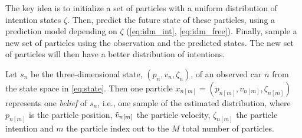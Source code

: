 The key idea is to initialize a set of particles with a uniform distribution of intention states $\zeta$. Then, predict the future state of these particles, using a prediction model depending on $\zeta$ (\ref{eq:idm_int}, \ref{eq:idm_free}). Finally, sample a new set of particles using the observation and the predicted states. The new set of particles will then have a better distribution of intentions. 

Let $s_n$ be the three-dimensional state, $( p_{n}, v_n, \zeta_n)$, of an observed car $n$ from the state space in \eqref{eq:state}. Then one particle $x_{n[m]} = ( p_{n[m]}, v_{n[m]}, \zeta_{n[m]} )$ represents one \textit{belief} of $s_n$, i.e., one sample of the estimated distribution, where $p_{n[m]}$ is the particle position, $\Tilde{v}_{n[m]}$ the particle velocity, $\zeta_{n[m]}$ the particle intention and $m$ the particle index out to the $M$ total number of particles. 



